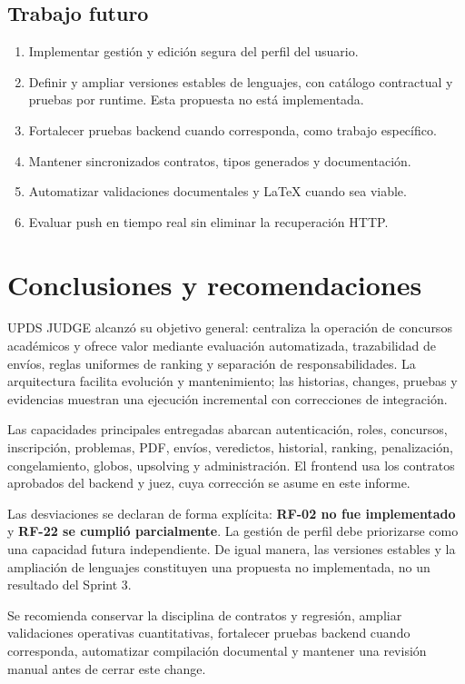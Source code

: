 \documentclass[11pt,a4paper]{article}
\begin{document}
\subsection{Trabajo futuro}
\begin{enumerate}
  \item Implementar gestión y edición segura del perfil del usuario.
  \item Definir y ampliar versiones estables de lenguajes, con catálogo contractual y pruebas por runtime. Esta propuesta no está implementada.
  \item Fortalecer pruebas backend cuando corresponda, como trabajo específico.
  \item Mantener sincronizados contratos, tipos generados y documentación.
  \item Automatizar validaciones documentales y LaTeX cuando sea viable.
  \item Evaluar push en tiempo real sin eliminar la recuperación HTTP.
\end{enumerate}

\section{Conclusiones y recomendaciones}
UPDS JUDGE alcanzó su objetivo general: centraliza la operación de concursos académicos y ofrece valor mediante evaluación automatizada, trazabilidad de envíos, reglas uniformes de ranking y separación de responsabilidades. La arquitectura facilita evolución y mantenimiento; las historias, changes, pruebas y evidencias muestran una ejecución incremental con correcciones de integración.

Las capacidades principales entregadas abarcan autenticación, roles, concursos, inscripción, problemas, PDF, envíos, veredictos, historial, ranking, penalización, congelamiento, globos, upsolving y administración. El frontend usa los contratos aprobados del backend y juez, cuya corrección se asume en este informe.

Las desviaciones se declaran de forma explícita: \textbf{RF-02 no fue implementado} y \textbf{RF-22 se cumplió parcialmente}. La gestión de perfil debe priorizarse como una capacidad futura independiente. De igual manera, las versiones estables y la ampliación de lenguajes constituyen una propuesta no implementada, no un resultado del Sprint 3.

Se recomienda conservar la disciplina de contratos y regresión, ampliar validaciones operativas cuantitativas, fortalecer pruebas backend cuando corresponda, automatizar compilación documental y mantener una revisión manual antes de cerrar este change.
\end{document}
